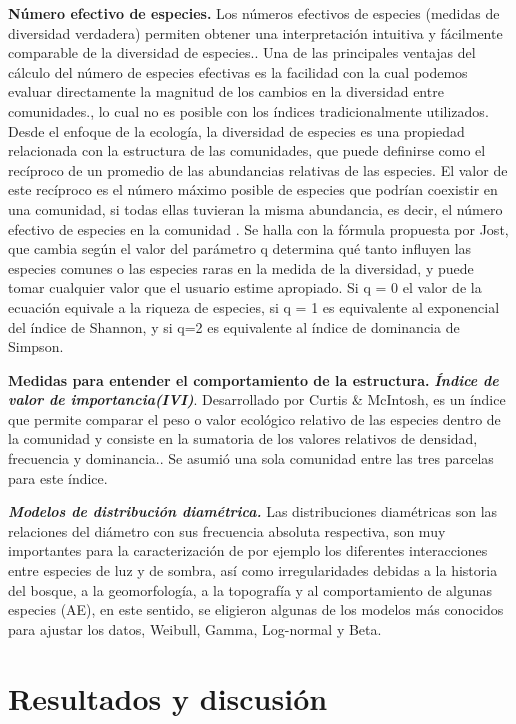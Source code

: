 \documentclass[conference,final,12pt,]{IEEEtran}
\begin{document}
\textbf{Número efectivo de especies.} Los números efectivos de especies
(medidas de diversidad verdadera) permiten obtener una interpretación
intuitiva y fácilmente comparable de la diversidad de especies.\citep{V}.
Una de las principales ventajas del cálculo del número de especies
efectivas es la facilidad con la cual podemos evaluar directamente la
magnitud de los cambios en la diversidad entre comunidades.\citep{W}, lo
cual no es posible con los índices tradicionalmente utilizados. Desde el
enfoque de la ecología, la diversidad de especies es una propiedad
relacionada con la estructura de las comunidades, que puede definirse
como el recíproco de un promedio de las abundancias relativas de las
especies. El valor de este recíproco es el número máximo posible de
especies que podrían coexistir en una comunidad, si todas ellas tuvieran
la misma abundancia, es decir, el número efectivo de especies en la
comunidad \citep{W}. Se halla con la fórmula propuesta por Jost, que
cambia según el valor del parámetro q determina qué tanto influyen las
especies comunes o las especies raras en la medida de la diversidad, y
puede tomar cualquier valor que el usuario estime apropiado. Si q = 0 el
valor de la ecuación equivale a la riqueza de especies, si q = 1 es
equivalente al exponencial del índice de Shannon, y si q=2 es
equivalente al índice de dominancia de Simpson.

\textbf{Medidas para entender el comportamiento de la estructura.}
\textbf{\emph{Índice de valor de importancia(IVI)}}. Desarrollado por
Curtis \& McIntosh\citep{T}, es un índice que permite comparar el peso o
valor ecológico relativo de las especies dentro de la comunidad y
consiste en la sumatoria de los valores relativos de densidad,
frecuencia y dominancia.\citep{U}. Se asumió una sola comunidad entre las
tres parcelas para este índice.

\textbf{\emph{Modelos de distribución diamétrica.}} Las distribuciones
diamétricas son las relaciones del diámetro con sus frecuencia absoluta
respectiva, son muy importantes para la caracterización de por ejemplo
los diferentes interacciones entre especies de luz y de sombra, así como
irregularidades debidas a la historia del bosque, a la geomorfología, a
la topografía y al comportamiento de algunas especies (AE), en este
sentido, se eligieron algunas de los modelos más conocidos para ajustar
los datos, Weibull, Gamma, Log-normal y Beta.

\hypertarget{resultados-y-discusiuxf3n}{%
\section{Resultados y discusión}\label{resultados-y-discusiuxf3n}}
\end{document}

